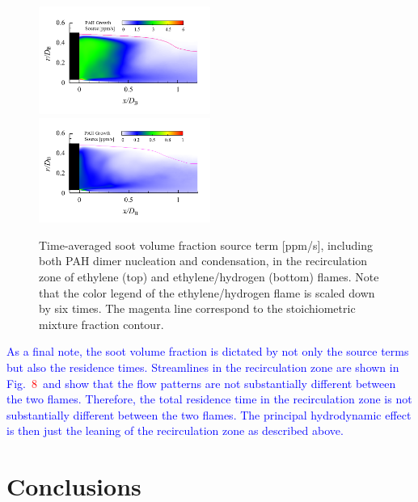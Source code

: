 \documentclass[review,3p,times]{elsarticle}
\begin{document}
 \begin{figure}[t]
  \centering
  \scriptsize
  \vspace{-0.10in}
  \includegraphics[trim=0mm 1.0mm 0mm 0.5mm, clip=true, width=0.5\textwidth]{ethy_pah_src.png}
  \includegraphics[trim=0mm 1.0mm 0mm 0.5mm, clip=true, width=0.5\textwidth]{hy_pah_src.png}
  \normalsize
  \vspace{-0.2in}
  \caption{Time-averaged soot volume fraction source term [ppm/s], including both PAH dimer nucleation and condensation, in the recirculation zone of ethylene (top) and ethylene/hydrogen (bottom) flames.  Note that the color legend of the ethylene/hydrogen flame is scaled down by six times.  The magenta line correspond to the stoichiometric mixture fraction contour.}
  \label{fig:pah_source}
\end{figure}

\textcolor{blue}{As a final note, the soot volume fraction is dictated by not only the source terms but also the residence times.  Streamlines in the recirculation zone are shown in Fig.~}\textcolor{red}{8}~\textcolor{blue}{and show that the flow patterns are not substantially different between the two flames.  Therefore, the total residence time in the recirculation zone is not substantially different between the two flames.  The principal hydrodynamic effect is then just the leaning of the recirculation zone as described above.}


\section{Conclusions}
\end{document}
